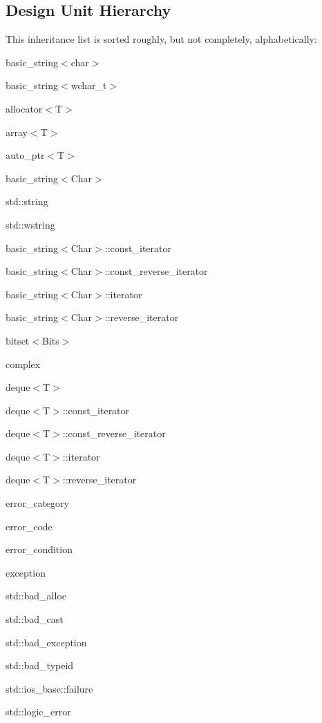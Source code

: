 \subsection{Design Unit Hierarchy}
This inheritance list is sorted roughly, but not completely, alphabetically\+:\begin{DoxyCompactList}
\item basic\+\_\+string$<$char$>$\item basic\+\_\+string$<$wchar\+\_\+t$>$\item {}
\item allocator$<$T$>$\item array$<$T$>$\item auto\+\_\+ptr$<$T$>$\item basic\+\_\+string$<$Char$>$\begin{DoxyCompactList}
\item std\+:\+:string\item std\+:\+:wstring\end{DoxyCompactList}
\item basic\+\_\+string$<$Char$>$\+:\+:const\+\_\+iterator\item basic\+\_\+string$<$Char$>$\+:\+:const\+\_\+reverse\+\_\+iterator\item basic\+\_\+string$<$Char$>$\+:\+:iterator\item basic\+\_\+string$<$Char$>$\+:\+:reverse\+\_\+iterator\item bitset$<$Bits$>$\item complex\item deque$<$T$>$\item deque$<$T$>$\+:\+:const\+\_\+iterator\item deque$<$T$>$\+:\+:const\+\_\+reverse\+\_\+iterator\item deque$<$T$>$\+:\+:iterator\item deque$<$T$>$\+:\+:reverse\+\_\+iterator\item error\+\_\+category\item error\+\_\+code\item error\+\_\+condition\item exception\begin{DoxyCompactList}
\item std\+:\+:bad\+\_\+alloc\item std\+:\+:bad\+\_\+cast\item std\+:\+:bad\+\_\+exception\item std\+:\+:bad\+\_\+typeid\item std\+:\+:ios\+\_\+base\+:\+:failure\item std\+:\+:logic\+\_\+error\begin{DoxyCompactList}

\end{DoxyCompactList}
\end{DoxyCompactList}
\end{DoxyCompactList}
